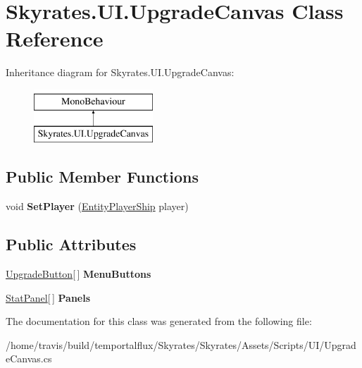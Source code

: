 \hypertarget{class_skyrates_1_1_u_i_1_1_upgrade_canvas}{\section{Skyrates.\-U\-I.\-Upgrade\-Canvas Class Reference}
\label{class_skyrates_1_1_u_i_1_1_upgrade_canvas}
}
Inheritance diagram for Skyrates.\-U\-I.\-Upgrade\-Canvas\-:\begin{figure}[H]
\begin{center}
\leavevmode
\includegraphics[height=2.000000cm]{class_skyrates_1_1_u_i_1_1_upgrade_canvas}
\end{center}
\end{figure}
\subsection*{Public Member Functions}
\begin{DoxyCompactItemize}
\item 
\hypertarget{class_skyrates_1_1_u_i_1_1_upgrade_canvas_a442918dc891859528c7bc0317387a6ec}{void {\bfseries Set\-Player} (\hyperlink{class_skyrates_1_1_entity_1_1_entity_player_ship}{Entity\-Player\-Ship} player)}\label{class_skyrates_1_1_u_i_1_1_upgrade_canvas_a442918dc891859528c7bc0317387a6ec}

\end{DoxyCompactItemize}
\subsection*{Public Attributes}
\begin{DoxyCompactItemize}
\item 
\hypertarget{class_skyrates_1_1_u_i_1_1_upgrade_canvas_a0d8db519ea20c20635cde2763b173a5a}{\hyperlink{class_skyrates_1_1_u_i_1_1_upgrade_button}{Upgrade\-Button}\mbox{[}$\,$\mbox{]} {\bfseries Menu\-Buttons}}\label{class_skyrates_1_1_u_i_1_1_upgrade_canvas_a0d8db519ea20c20635cde2763b173a5a}

\item 
\hypertarget{class_skyrates_1_1_u_i_1_1_upgrade_canvas_af35e54cfa85920e49e7d8dc075bc6596}{\hyperlink{class_skyrates_1_1_u_i_1_1_stat_panel}{Stat\-Panel}\mbox{[}$\,$\mbox{]} {\bfseries Panels}}\label{class_skyrates_1_1_u_i_1_1_upgrade_canvas_af35e54cfa85920e49e7d8dc075bc6596}

\end{DoxyCompactItemize}


The documentation for this class was generated from the following file\-:\begin{DoxyCompactItemize}
\item 
/home/travis/build/temportalflux/\-Skyrates/\-Skyrates/\-Assets/\-Scripts/\-U\-I/Upgrade\-Canvas.\-cs\end{DoxyCompactItemize}
